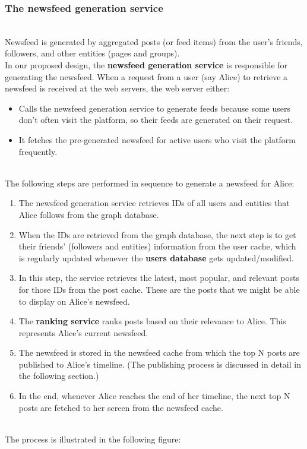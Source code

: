 \subsubsection{The newsfeed generation service}\label{Ju1rYQo9daV5SEJ4UKG3C}
\\
Newsfeed is generated by aggregated posts (or feed items) from the user's friends, followers, and other entities (pages and groups).
\\
In our proposed design, the \textbf{newsfeed generation service} is responsible for generating the newsfeed. When a request from a user (say Alice) to retrieve a newsfeed is received at the web servers, the web server either:

\begin{itemize}
\item
\protect{}\label{NcQZhI0yfI64iq2As-_6R}
Calls the newsfeed generation service to generate feeds because some users don't often visit the platform, so their feeds are generated on their request.
\item
\protect{}\label{9_eI6gGqUaKuN5uRRlv5R}
It fetches the pre-generated newsfeed for active users who visit the platform frequently.
\end{itemize}
\\
The following steps are performed in sequence to generate a newsfeed for Alice:

\begin{enumerate}
\item
\protect{}\label{ulS4HqgVr-ZoEzRkOrvhq}
The newsfeed generation service retrieves IDs of all users and entities that Alice follows from the graph database.
\item
\protect{}\label{L2Ck54v7WWBuyPf1FLu8n}
When the IDs are retrieved from the graph database, the next step is to get their friends' (followers and entities) information from the user cache, which is regularly updated whenever the \textbf{users database} gets updated/modified.
\item
\protect{}\label{izTPAVJPAThOS9vExbvxK}
In this step, the service retrieves the latest, most popular, and relevant posts for those IDs from the post cache. These are the posts that we might be able to display on Alice's newsfeed.
\item
\protect{}\label{1BQ7DiK3VqIDb2v-LT8Qx}
The \textbf{ranking service} ranks posts based on their relevance to Alice. This represents Alice's current newsfeed.
\item
\protect{}\label{7viFEfH7R6wNj_IJ-xRp3}
The newsfeed is stored in the newsfeed cache from which the top N posts are published to Alice's timeline. (The publishing process is discussed in detail in the following section.)
\item
\protect{}\label{YF-qhUk1Y7AUOv66l01_D}
In the end, whenever Alice reaches the end of her timeline, the next top N posts are fetched to her screen from the newsfeed cache.
\end{enumerate}
\\
The process is illustrated in the following figure:

